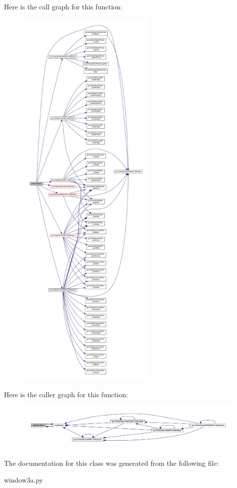 Here is the call graph for this function\-:\nopagebreak
\begin{figure}[H]
\begin{center}
\leavevmode
\includegraphics[height=550pt]{classgui_1_1window3a_1_1MainWindow_a784d15d1157ea5b181c63d73daa3fc5e_cgraph}
\end{center}
\end{figure}




Here is the caller graph for this function\-:\nopagebreak
\begin{figure}[H]
\begin{center}
\leavevmode
\includegraphics[width=350pt]{classgui_1_1window3a_1_1MainWindow_a784d15d1157ea5b181c63d73daa3fc5e_icgraph}
\end{center}
\end{figure}




The documentation for this class was generated from the following file\-:\begin{DoxyCompactItemize}
\item 
window3a.\-py\end{DoxyCompactItemize}

